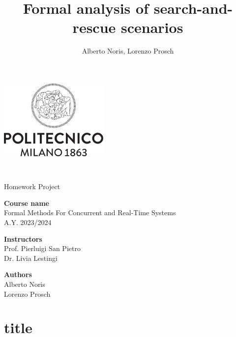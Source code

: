 \documentclass[a4paper,12pt]{article}
\author{Alberto Noris, Lorenzo Prosch}
\title{Formal analysis of search-and-rescue scenarios}
\begin{document}
	
	\begin{center}
		
		\thispagestyle{empty}	%
		
		\includegraphics[width=0.4\textwidth]{root/images/extra/Logo_poli}
		
		\vspace{2cm}
		
		\textbf{\fontsize{32}{\baselineskip}\selectfont {Formal analysis of search-and-rescue scenarios}}\\
		
		\vspace{0.6cm}
		
		\fontsize{18}{\baselineskip}\selectfont Homework Project\\
		
		\vspace{2cm}
		
		\textbf{Course name}\\ 	{
			\setlength{\baselineskip}{1.4\baselineskip}
			Formal Methods For Concurrent and Real-Time Systems\\
			A.Y. 2023/2024\\
		}
		
		\vspace{1cm}
		
		\textbf{Instructors}\\
		{
			\setlength{\baselineskip}{1.4\baselineskip}
			Prof. Pierluigi San Pietro\\
			Dr. Livia Lestingi\\
		}
		
		\vspace{2cm}
		
		\textbf{Authors}\\
		{
			\setlength{\baselineskip}{1.4\baselineskip}
			Alberto Noris\\
			Lorenzo Prosch\\
		}\part{title}
		
	\end{center}
	
	
	\clearpage
	\hypersetup{linkcolor=black}
	\tableofcontents
	\thispagestyle{empty}
	
	\renewcommand{\rmdefault}{phv}
	\renewcommand{\normalsize}{\fontsize{14}{17.4}\selectfont}
	\newpage

	
	
	
	
	
\end{document}
